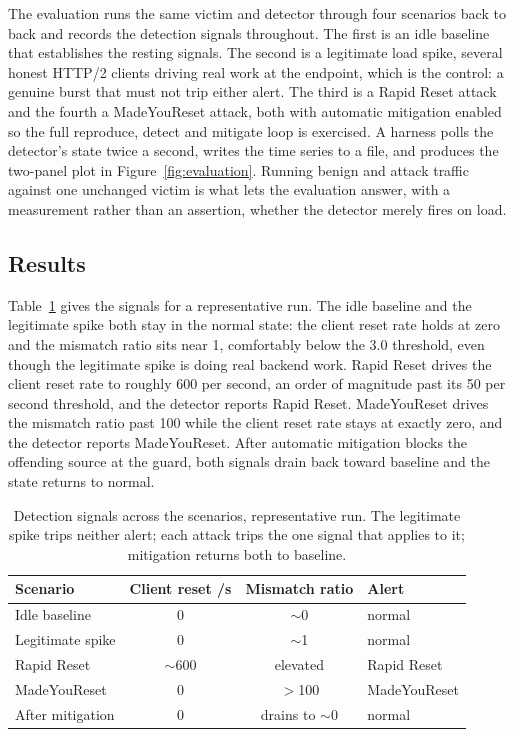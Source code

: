 \documentclass[a4paper,fleqn]{cas-dc}
\begin{document}
The evaluation runs the same victim and detector through four scenarios back to back and records the detection signals throughout. The first is an idle baseline that establishes the resting signals. The second is a legitimate load spike, several honest HTTP/2 clients driving real work at the endpoint, which is the control: a genuine burst that must not trip either alert. The third is a Rapid Reset attack and the fourth a MadeYouReset attack, both with automatic mitigation enabled so the full reproduce, detect and mitigate loop is exercised. A harness polls the detector's state twice a second, writes the time series to a file, and produces the two-panel plot in Figure~\ref{fig:evaluation}. Running benign and attack traffic against one unchanged victim is what lets the evaluation answer, with a measurement rather than an assertion, whether the detector merely fires on load.

\subsection{Results}\label{sec:eval-results}

Table~\ref{tab:results} gives the signals for a representative run. The idle baseline and the legitimate spike both stay in the normal state: the client reset rate holds at zero and the mismatch ratio sits near 1, comfortably below the 3.0 threshold, even though the legitimate spike is doing real backend work. Rapid Reset drives the client reset rate to roughly 600 per second, an order of magnitude past its 50 per second threshold, and the detector reports Rapid Reset. MadeYouReset drives the mismatch ratio past 100 while the client reset rate stays at exactly zero, and the detector reports MadeYouReset. After automatic mitigation blocks the offending source at the guard, both signals drain back toward baseline and the state returns to normal.

\begin{table}[tp]
\centering
\small
\caption{Detection signals across the scenarios, representative run. The legitimate spike trips neither alert; each attack trips the one signal that applies to it; mitigation returns both to baseline.}
\label{tab:results}
\begin{tabular}{@{}lccl@{}}
\toprule
Scenario & Client reset /s & Mismatch ratio & Alert \\
\midrule
Idle baseline & 0 & $\sim$0 & normal \\
Legitimate spike & 0 & $\sim$1 & normal \\
Rapid Reset & $\sim$600 & elevated & Rapid Reset \\
MadeYouReset & 0 & $>$100 & MadeYouReset \\
After mitigation & 0 & drains to $\sim$0 & normal \\
\bottomrule
\end{tabular}
\end{table}
\end{document}
